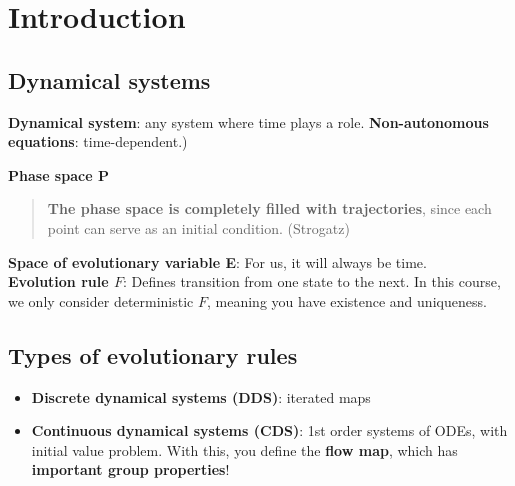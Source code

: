 
\section{Introduction}
\subsection{Dynamical systems}
\textbf{Dynamical system}: any system where time plays a role.
\textbf{Non-autonomous equations}: time-dependent.)
\begin{tcolorbox}
    \textbf{Phase space P} 
    \begin{quote}
        \textbf{The phase space is completely filled with trajectories}, since each point can serve as an initial condition. (Strogatz)
    \end{quote}
    \textbf{Space of evolutionary variable E}: For us, it will always be time.\\
    \textbf{Evolution rule $F$}: Defines transition from one state to the next. In this course, we only consider deterministic $F$, meaning you have existence and uniqueness.
\end{tcolorbox}
    

\subsection{Types of evolutionary rules}

\begin{itemize}
    \item \textbf{Discrete dynamical systems (DDS)}: iterated maps
    \item \textbf{Continuous dynamical systems (CDS)}: 1st order systems of ODEs, with initial value problem. With this, you define the  \textbf{flow map}, which has \textbf{important group properties}! \danger
\end{itemize}
